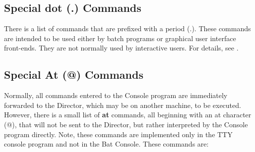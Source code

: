 \subsection{Special dot (.) Commands}
\label{dotcommands}

There is a list of commands that are prefixed with a period (.). These
commands are intended to be used either by batch programs or graphical user
interface front-ends. They are not normally used by interactive users.
For details, see \bareosDeveloperGuideDotCommands.


\subsection{Special At (@) Commands}
\label{atcommands}

Normally, all commands entered to the Console program are immediately
forwarded to the Director, which may be on another machine, to be executed.
However, there is a small list of {\bf at} commands, all beginning with an at
character (@), that will not be sent to the Director, but rather interpreted
by the Console program directly. Note, these commands are implemented only in
the TTY console program and not in the Bat Console. These commands are:

